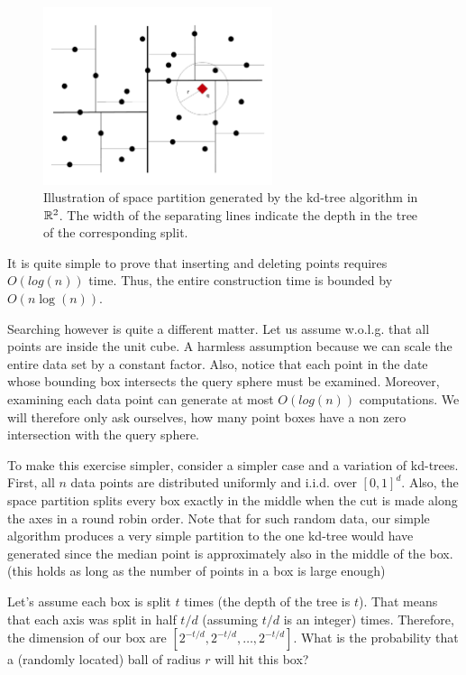 \documentclass{article}
\begin{document}
\begin{figure}[h!]
  \centering
  \includegraphics[width=0.6\textwidth]{10_images/nns.pdf}
  \caption{Illustration of space partition generated by the kd-tree algorithm in ${\mathbb{R}}^2$. 
  The width of the separating lines indicate the depth in the tree of the corresponding split.}
\end{figure}
It is quite simple to prove that inserting and deleting points requires $O(log(n))$ time.
Thus, the entire construction time is bounded by $O(n\log(n))$.

Searching however is quite a different matter.
Let us assume w.o.l.g. that all points are inside the unit cube. 
A harmless assumption because we can scale the entire data set by a constant factor.
Also, notice that each point in the date whose bounding box intersects the query sphere must be
examined. Moreover, examining each data point can generate at most $O(log(n))$ computations.
We will therefore only ask ourselves, how many point boxes have a non zero intersection with the query sphere.

To make this exercise simpler, consider a simpler case and a variation of kd-trees.
First, all $n$ data points are distributed uniformly and i.i.d. over $[0,1]^{d}$.
Also, the space partition splits every box exactly in the middle when the cut is
made along the axes in a round robin order.
Note that for such random data, our simple algorithm produces a very simple partition to the
one kd-tree would have generated since the median point is approximately also in the middle of the box.
(this holds as long as the number of points in a box is large enough)

Let's assume each box is split $t$ times (the depth of the tree is $t$). 
That means that each axis was split in half $t/d$ (assuming $t/d$ is an integer) times.
Therefore, the dimension of our box are $[2^{-t/d},2^{-t/d},\ldots,2^{-t/d}]$.
What is the probability that a (randomly located) ball of radius $r$ will hit this box?
\end{document}

